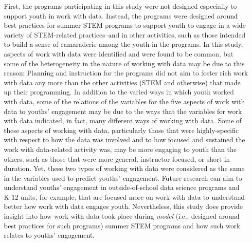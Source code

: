\documentclass[]{msu-thesis}
\theoremstyle{definition}
\theoremstyle{definition}
\theoremstyle{definition}
\theoremstyle{remark}
\begin{document}
First, the programs participating in this study were not designed
especially to support youth in work with data. Instead, the programs
were designed around best practices for summer STEM programs to support
youth to engage in a wide variety of STEM-related practices--and in
other activities, such as those intended to build a sense of camaraderie
among the youth in the programs. In this study, aspects of work with
data were identified and were found to be common, but some of the
heterogeneity in the nature of working with data may be due to this
reason: Planning and instruction for the programs did not aim to foster
rich work with data any more than the other activities (STEM and
otherwise) that made up their programming. In addition to the varied
ways in which youth worked with data, some of the relations of the
variables for the five aspects of work with data to youths' engagement
may be due to the ways that the variables for work with data indicated,
in fact, many different ways of working with data. Some of these aspects
of working with data, particularly those that were highly-specific with
respect to how the data was involved and to how focused and sustained
the work with data-related activity was, may be more engaging to youth
than the others, such as those that were more general,
instructor-focused, or short in duration. Yet, these two types of
working with data were considered as the same in the variables used to
predict youths' engagement. Future research can aim to understand
youths' engagement in outside-of-school data science programs and K-12
units, for example, that are focused more on work with data to
understand better how work with data engages youth. Nevertheless, this
study does provide insight into how work with data took place during
\emph{model} (i.e., designed around best practices for such programs)
summer STEM programs and how such work relates to youths' engagement.
\end{document}

